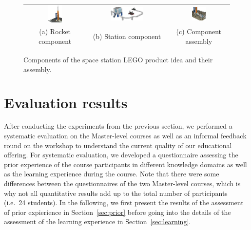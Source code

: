 \documentclass{PDS}
\begin{document}
\begin{figure}[htbp]
    \begin{center}
        \begin{tabular}{ccc}
            \includegraphics[width=0.24\textwidth]{./figures/space_rocket.png} &
            \includegraphics[width=0.44\textwidth]{./figures/space_station.png} &
            \includegraphics[width=0.24\textwidth]{./figures/space_assembly.png} \\
            (a) Rocket component &
            (b) Station component &
            (c) Component assembly
        \end{tabular}
    \end{center}
    \caption{Components of the space station LEGO product idea and their assembly.}
    \label{fig:school-sub}
\end{figure}

\section{Evaluation results}
\label{sec:discussion}

After conducting the experiments from the previous section, we performed a systematic evaluation on the Master-level courses as well as an informal feedback round on the workshop to understand the current quality of our educational offering.
For systematic evaluation, we developed a questionnaire assessing the prior experience of the course participants in different knowledge domains as well as the learning experience during the course.
Note that there were some differences between the questionnaires of the two Master-level courses, which is why not all quantitative results add up to the total number of participants (i.e.\ 24 students).
In the following, we first present the results of the assessment of prior expierience in Section~\ref{sec:prior} before going into the details of the assessment of the learning experience in Section~\ref{sec:learning}.
\end{document}
